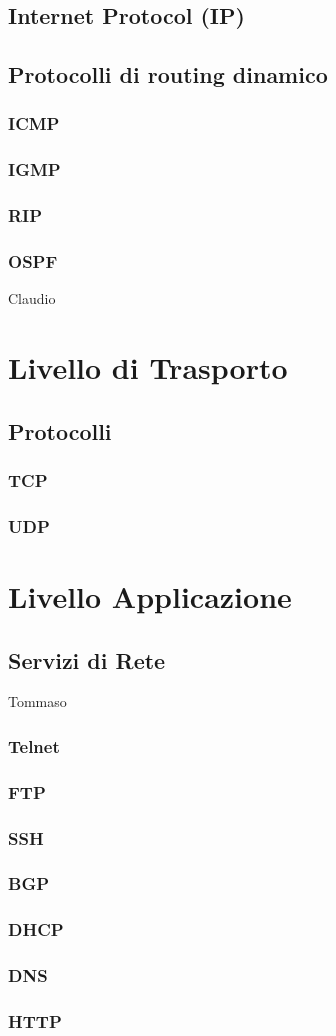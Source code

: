 \documentclass[a4paper,11pt]{paper}
\begin{document}
\subsection{Internet Protocol (IP)}


\subsection{Protocolli di routing dinamico}
\subsubsection{ICMP}
\subsubsection{IGMP}
\subsubsection{RIP}
\subsubsection{OSPF}


Claudio
\newpage
\section{Livello di Trasporto}
\subsection{Protocolli}
\subsubsection{TCP}
\subsubsection{UDP}
\newpage

\section{Livello Applicazione}
\subsection{Servizi di Rete}
Tommaso
\subsubsection{Telnet}
\subsubsection{FTP}
\subsubsection{SSH}
\subsubsection{BGP}
\subsubsection{DHCP}
\subsubsection{DNS}
\subsubsection{HTTP}
\end{document}
